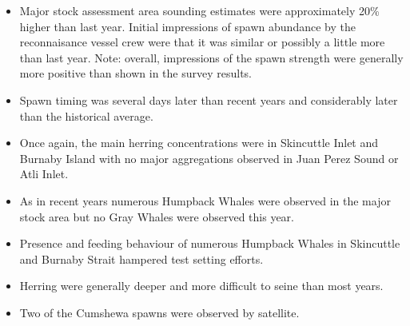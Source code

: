 \begin{itemize}

\item Major stock assessment area sounding estimates
were approximately 20\% higher than last year.
Initial impressions of spawn abundance by the reconnaisance vessel crew
were that it was similar or possibly a little more than last year.
Note: overall, impressions of the spawn strength
were generally more positive than shown in the survey results.

\item Spawn timing was several days later than recent years and
considerably later than the historical average.

\item Once again, the main herring concentrations were in
Skincuttle Inlet and Burnaby Island
with no major aggregations observed in Juan Perez Sound or Atli Inlet.

\item As in recent years numerous Humpback Whales were observed
in the major stock area but no Gray Whales were observed this year.

\item Presence and feeding behaviour of numerous Humpback Whales
in Skincuttle and Burnaby Strait hampered test setting efforts.

\item Herring were generally deeper and more difficult to seine than most years.

\item Two of the Cumshewa spawns were observed by satellite.

\end{itemize}